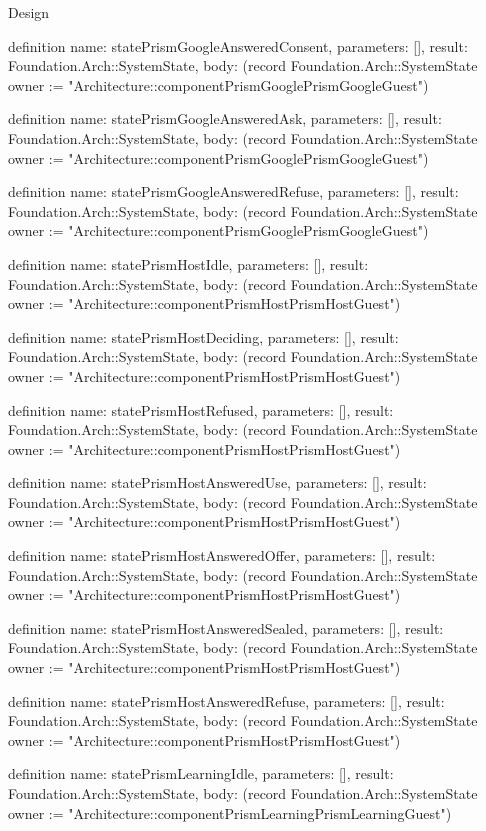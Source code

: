 \begin{lexlean}{Design}
\begin{semanticmodule}
definition{
  name: statePrismGoogleAnsweredConsent,
  parameters: [],
  result: Foundation.Arch::SystemState,
  body: (record Foundation.Arch::SystemState {owner := "Architecture::componentPrismGooglePrismGoogleGuest"})
}

definition{
  name: statePrismGoogleAnsweredAsk,
  parameters: [],
  result: Foundation.Arch::SystemState,
  body: (record Foundation.Arch::SystemState {owner := "Architecture::componentPrismGooglePrismGoogleGuest"})
}

definition{
  name: statePrismGoogleAnsweredRefuse,
  parameters: [],
  result: Foundation.Arch::SystemState,
  body: (record Foundation.Arch::SystemState {owner := "Architecture::componentPrismGooglePrismGoogleGuest"})
}

definition{
  name: statePrismHostIdle,
  parameters: [],
  result: Foundation.Arch::SystemState,
  body: (record Foundation.Arch::SystemState {owner := "Architecture::componentPrismHostPrismHostGuest"})
}

definition{
  name: statePrismHostDeciding,
  parameters: [],
  result: Foundation.Arch::SystemState,
  body: (record Foundation.Arch::SystemState {owner := "Architecture::componentPrismHostPrismHostGuest"})
}

definition{
  name: statePrismHostRefused,
  parameters: [],
  result: Foundation.Arch::SystemState,
  body: (record Foundation.Arch::SystemState {owner := "Architecture::componentPrismHostPrismHostGuest"})
}

definition{
  name: statePrismHostAnsweredUse,
  parameters: [],
  result: Foundation.Arch::SystemState,
  body: (record Foundation.Arch::SystemState {owner := "Architecture::componentPrismHostPrismHostGuest"})
}

definition{
  name: statePrismHostAnsweredOffer,
  parameters: [],
  result: Foundation.Arch::SystemState,
  body: (record Foundation.Arch::SystemState {owner := "Architecture::componentPrismHostPrismHostGuest"})
}

definition{
  name: statePrismHostAnsweredSealed,
  parameters: [],
  result: Foundation.Arch::SystemState,
  body: (record Foundation.Arch::SystemState {owner := "Architecture::componentPrismHostPrismHostGuest"})
}

definition{
  name: statePrismHostAnsweredRefuse,
  parameters: [],
  result: Foundation.Arch::SystemState,
  body: (record Foundation.Arch::SystemState {owner := "Architecture::componentPrismHostPrismHostGuest"})
}

definition{
  name: statePrismLearningIdle,
  parameters: [],
  result: Foundation.Arch::SystemState,
  body: (record Foundation.Arch::SystemState {owner := "Architecture::componentPrismLearningPrismLearningGuest"})
}


\end{semanticmodule}
\end{lexlean}
